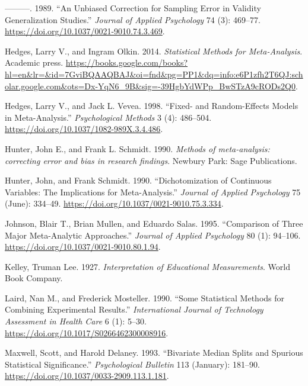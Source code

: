 \documentclass[
  letterpaper,
  DIV=11,
  numbers=noendperiod]{scrreprt}
\newlength{\cslhangindent}
\newlength{\cslentryspacingunit} %
\newenvironment{CSLReferences}[2] %
 {%
  \setlength{\parindent}{0pt}
  \ifodd #1
  \let\oldpar\par
  \def\par{\hangindent=\cslhangindent\oldpar}
  \fi
  \setlength{\parskip}{#2\cslentryspacingunit}
 }%
 {}
\begin{document}
\begin{CSLReferences}{1}{0}
\leavevmode{}%
---------. 1989. {``An Unbiased Correction for Sampling Error in
Validity Generalization Studies.''} \emph{Journal of Applied Psychology}
74 (3): 469--77. \url{https://doi.org/10.1037/0021-9010.74.3.469}.

\leavevmode{}%
Hedges, Larry V., and Ingram Olkin. 2014. \emph{Statistical Methods for
Meta-Analysis}. Academic press.
\url{https://books.google.com/books?hl=en\&lr=\&id=7GviBQAAQBAJ\&oi=fnd\&pg=PP1\&dq=info:e6P1zfh2T6QJ:scholar.google.com\&ots=Dx-YqN6_9B\&sig=-39HgbYdWPp_BwSTzA9cRODs2Q0}.

\leavevmode{}%
Hedges, Larry V., and Jack L. Vevea. 1998. {``Fixed- and Random-Effects
Models in Meta-Analysis.''} \emph{Psychological Methods} 3 (4):
486--504. \url{https://doi.org/10.1037/1082-989X.3.4.486}.

\leavevmode{}%
Hunter, John E., and Frank L. Schmidt. 1990. \emph{Methods of
meta-analysis: correcting error and bias in research findings}. Newbury
Park: Sage Publications.

\leavevmode{}%
Hunter, John, and Frank Schmidt. 1990. {``Dichotomization of Continuous
Variables: The Implications for Meta-Analysis.''} \emph{Journal of
Applied Psychology} 75 (June): 334--49.
\url{https://doi.org/10.1037/0021-9010.75.3.334}.

\leavevmode{}%
Johnson, Blair T., Brian Mullen, and Eduardo Salas. 1995. {``Comparison
of Three Major Meta-Analytic Approaches.''} \emph{Journal of Applied
Psychology} 80 (1): 94--106.
\url{https://doi.org/10.1037/0021-9010.80.1.94}.

\leavevmode{}%
Kelley, Truman Lee. 1927. \emph{Interpretation of Educational
Measurements}. World Book Company.

\leavevmode{}%
Laird, Nan M., and Frederick Mosteller. 1990. {``Some Statistical
Methods for Combining Experimental Results.''} \emph{International
Journal of Technology Assessment in Health Care} 6 (1): 5--30.
\url{https://doi.org/10.1017/S0266462300008916}.

\leavevmode{}%
Maxwell, Scott, and Harold Delaney. 1993. {``Bivariate Median Splits and
Spurious Statistical Significance.''} \emph{Psychological Bulletin} 113
(January): 181--90. \url{https://doi.org/10.1037/0033-2909.113.1.181}.


\end{CSLReferences}
\end{document}
